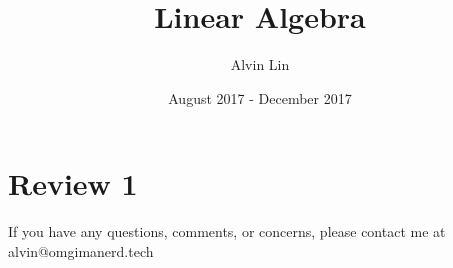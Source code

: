 \documentclass[letterpaper, 12pt]{math}
\title{Linear Algebra}
\author{Alvin Lin}
\date{August 2017 - December 2017}
\begin{document}
\maketitle

\section*{Review 1}

\begin{center}
  If you have any questions, comments, or concerns, please contact me at
  alvin@omgimanerd.tech
\end{center}
\end{document}
